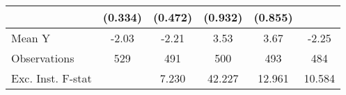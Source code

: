 {\begin{tabular}{l*{5}{c}}
            &     (0.334)         &     (0.472)         &     (0.932)         &     (0.855)         &                     \\
\midrule
Mean Y      &       -2.03         &       -2.21         &        3.53         &        3.67         &       -2.25         \\
Observations&         529         &         491         &         500         &         493         &         484         \\
Exc. Inst. F-stat&                     &       7.230         &      42.227         &      12.961         &      10.584         \\
\bottomrule
\end{tabular}
}
